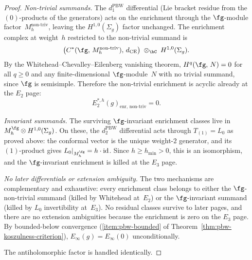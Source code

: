 \begin{proof}
\emph{Non-trivial summands.}
The $d_1^{\mathrm{PBW}}$ differential
(Lie bracket residue from the $(0)$-products of the generators)
acts on the enrichment through the $\fg$-module
factor~$M_h^{\mathrm{non\text{-}triv}}$, leaving the
$H^{1,0}(\Sigma_g)$ factor unchanged.  The enrichment complex
at weight~$h$ restricted to the non-trivial summand is
\[
\bigl(C^*(\fg,\, M_h^{\mathrm{non\text{-}triv}}),\, d_{\mathrm{CE}}\bigr)
\;\otimes_{\bC}\;
H^{1,0}(\Sigma_g).
\]
By the Whitehead--Chevalley--Eilenberg vanishing theorem,
$H^q(\fg,\, N) = 0$ for all $q \geq 0$ and any
finite-dimensional $\fg$-module~$N$ with no trivial summand,
since $\fg$ is semisimple.  Therefore the non-trivial
enrichment is acyclic already at the $E_2$ page:
\[
E_2^{*,h}(g)_{\mathrm{enr,\, non\text{-}triv}} = 0.
\]

\emph{Invariant summands.}
The surviving $\fg$-invariant enrichment classes live in
$M_h^{\fg} \otimes H^{1,0}(\Sigma_g)$.  On these, the
$d_2^{\mathrm{PBW}}$ differential acts through $T_{(1)} = L_0$
as proved above: the conformal vector is the unique weight-$2$
generator, and its $(1)$-product gives
$L_0|_{M_h^{\fg}} = h \cdot \mathrm{id}$.  Since
$h \geq h_{\min} > 0$, this is an isomorphism, and the
$\fg$-invariant enrichment is killed at the $E_3$ page.

\emph{No later differentials or extension ambiguity.}
The two mechanisms are complementary and exhaustive:
every enrichment class belongs to either the
$\fg$-non-trivial summand (killed by Whitehead at~$E_2$)
or the $\fg$-invariant summand (killed by $L_0$ invertibility
at~$E_3$).  No residual classes survive to later pages,
and there are no extension ambiguities because the enrichment
is zero on the $E_3$ page.  By bounded-below convergence
\textup{(}\ref{item:pbw-bounded} of
Theorem~\ref{thm:pbw-koszulness-criterion}\textup{)},
$E_\infty(g) = E_\infty(0)$ unconditionally.

The antiholomorphic factor is handled identically.
\end{proof}

